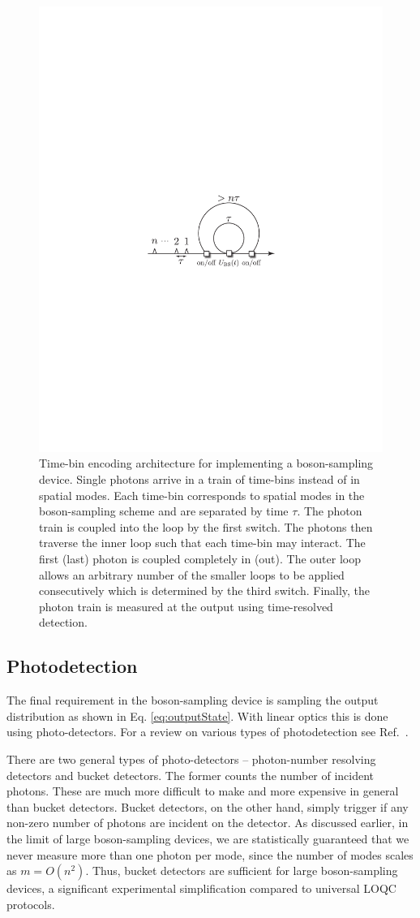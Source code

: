 \documentclass[aps,pra,twocolumn,amsmath,amssymb,nofootinbib,superscriptaddress]{revtex4}
\begin{document}
\begin{figure}[!htb]
\includegraphics[width=0.7\columnwidth]{fiber_loop}
\caption{Time-bin encoding architecture for implementing a boson-sampling device. Single photons arrive in a train of time-bins instead of in spatial modes. Each time-bin corresponds to spatial modes in the boson-sampling scheme and are separated by time $\tau$. The photon train is coupled into the loop by the first switch. The photons then traverse the inner loop such that each time-bin may interact. The first (last) photon is coupled completely in (out). The outer loop allows an arbitrary number of the smaller loops to be applied consecutively which is determined by the third switch. Finally, the photon train is measured at the output using time-resolved detection.}
\label{fig:fiber_loop}
\end{figure}

\subsection{Photodetection}

The final requirement in the boson-sampling device is sampling the output distribution as shown in Eq. \ref{eq:outputState}. With linear optics this is done using photo-detectors. For a review on various types of photodetection see Ref.~\cite{bib:SourceAndDetectorReview}.  

There are two general types of photo-detectors -- photon-number resolving detectors and bucket detectors. The former counts the number of incident photons. These are much more difficult to make and more expensive in general than bucket detectors. Bucket detectors, on the other hand, simply trigger if any non-zero number of photons are incident on the detector. As discussed earlier, in the limit of large boson-sampling devices, we are statistically guaranteed that we never measure more than one photon per mode, since the number of modes scales as \mbox{$m=O(n^2)$}. Thus, bucket detectors are sufficient for large boson-sampling devices, a significant experimental simplification compared to universal LOQC protocols. 
\end{document}
